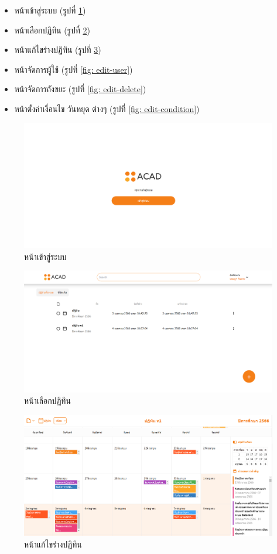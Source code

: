 \begin{itemize}
  \item หน้าเข้าสู่ระบบ (รูปที่ \ref*{fig: login-page})
  \item หน้าเลือกปฏิทิน (รูปที่ \ref*{fig: choose-calendar})
  \item หน้าแก้ไขร่างปฏิทิน (รูปที่ \ref*{fig: edit-calendar})
  \item หน้าจัดการผู้ใช้ (รูปที่ \ref*{fig: edit-user})
  \item หน้าจัดการถังขยะ (รูปที่ \ref*{fig: edit-delete})
  \item หน้าตั้งค่าเงื่อนไข วันหยุด ต่างๆ (รูปที่ \ref*{fig: edit-condition})
\end{itemize}

\begin{figure}[h]
  \centering
  \includegraphics[width= 1\textwidth]{login.png}
  \caption{หน้าเข้าสู่ระบบ}
  \label{fig: login-page}
\end{figure}
\begin{figure}[h]
  \centering
  \includegraphics[width= 1\textwidth]{choose-calendar.png}
  \caption{ หน้าเลือกปฏิทิน}
  \label{fig: choose-calendar}
\end{figure}
\begin{figure}[h]
  \centering
  \includegraphics[width= 1\textwidth]{edit-calendar.png}
  \caption{หน้าแก้ไขร่างปฏิทิน}
  \label{fig: edit-calendar}
\end{figure}
